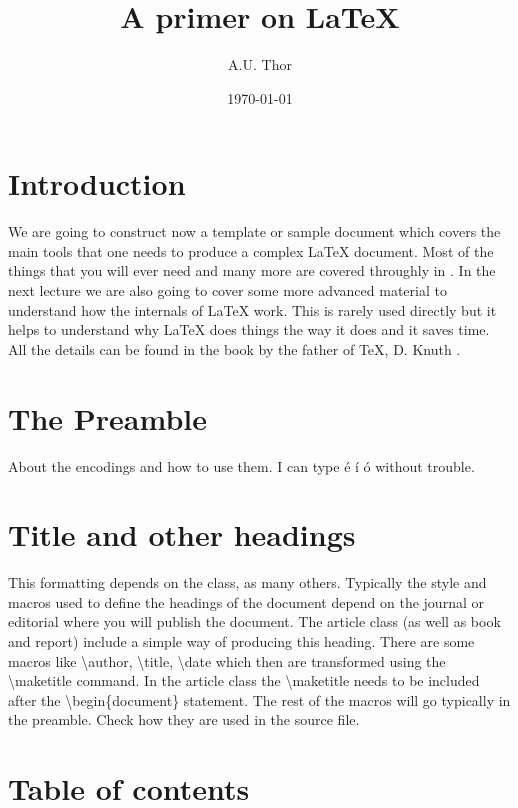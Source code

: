 \documentclass[a4paper]{article}
\author{A.U. Thor} %
\title{A primer on \LaTeX} %
\date{\today} %
\begin{document}
\maketitle

\tableofcontents

\section{Introduction}

We are going to construct now a template or sample document which covers the main tools that one needs to produce a complex \LaTeX{} document. Most of the things that you will ever need and many more are covered throughly in \cite{MittelbachGoossens2004}. In the next lecture we are also going to cover some more advanced material to understand how the internals of \LaTeX{} work. This is rarely used directly but it helps to understand why \LaTeX{} does things the way it does and it saves time. All the details can be found in the book by the father of \TeX, D. Knuth \cite{Knuth1990}.

\section{The Preamble}

About the encodings and how to use them. I can type é í ó without trouble.

\section{Title and other headings}

This formatting depends on the class, as many others. Typically the style and macros used to define the headings of the document depend on the journal or editorial where you will publish the document. The article class (as well as book and report) include a simple way of producing this heading. There are some macros like \textbackslash{}author, \textbackslash{}title, \textbackslash{}date which then are transformed using the \textbackslash{}maketitle command. In the article class the \textbackslash{}maketitle needs to be included after the \textbackslash{}begin\{document\} statement. The rest of the macros will go typically in the preamble. Check how they are used in the source file.


\section{Table of contents}
\end{document}
